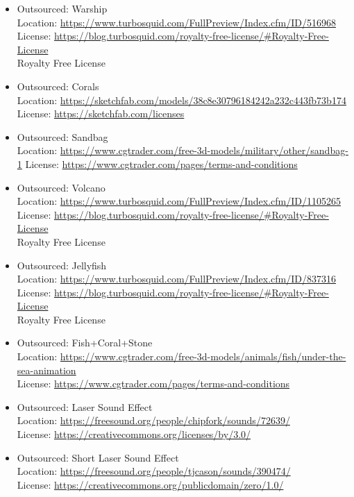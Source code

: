 \documentclass{article}
\begin{document}
\begin{itemize}
\item Outsourced: Warship\\
	Location: \url{https://www.turbosquid.com/FullPreview/Index.cfm/ID/516968}
	License: \url{https://blog.turbosquid.com/royalty-free-license/#Royalty-Free-License}\\
    Royalty Free License

\item Outsourced: Corals\\
	Location: \url{https://sketchfab.com/models/38c8e30796184242a232c443fb73b174}
	License: \url{https://sketchfab.com/licenses}

\item Outsourced: Sandbag\\
	Location:
\url{https://www.cgtrader.com/free-3d-models/military/other/sandbag-1}
License: \url{https://www.cgtrader.com/pages/terms-and-conditions}

\item Outsourced: Volcano\\
	Location:
\url{https://www.turbosquid.com/FullPreview/Index.cfm/ID/1105265}\\
	License: \url{https://blog.turbosquid.com/royalty-free-license/#Royalty-Free-License}\\
    Royalty Free License
    
\item Outsourced: Jellyfish\\
	Location:
\url{https://www.turbosquid.com/FullPreview/Index.cfm/ID/837316}\\
	License: \url{https://blog.turbosquid.com/royalty-free-license/#Royalty-Free-License}\\
    Royalty Free License
    
\item Outsourced: Fish+Coral+Stone\\
	Location:
\url{https://www.cgtrader.com/free-3d-models/animals/fish/under-the-sea-animation}\\
	License: \url{https://www.cgtrader.com/pages/terms-and-conditions}
	
\item Outsourced: Laser Sound Effect\\
	Location: 
\url{https://freesound.org/people/chipfork/sounds/72639/}\\
	License: 
\url{https://creativecommons.org/licenses/by/3.0/}

\item Outsourced: Short Laser Sound Effect\\
	Location:
\url{https://freesound.org/people/tjcason/sounds/390474/}\\
	License:
\url{https://creativecommons.org/publicdomain/zero/1.0/}


\end{itemize}
\end{document}
